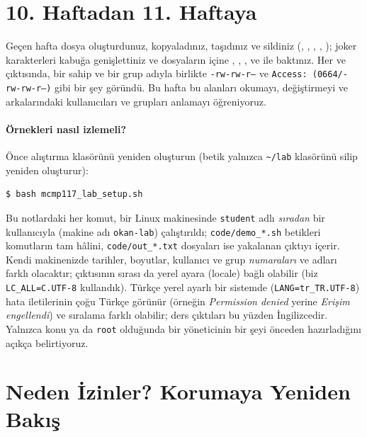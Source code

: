 \setcounter{tocdepth}{1}
\tableofcontents

\section{10. Haftadan 11. Haftaya}

Geçen hafta dosya oluşturdunuz, kopyaladınız, taşıdınız ve sildiniz (, , , , ); joker karakterleri kabuğa genişlettiniz ve dosyaların içine , , ,  ve  ile baktınız. Her  ve  çıktısında, bir sahip ve bir grup adıyla birlikte \texttt{-rw-rw-r--} ve \texttt{Access: (0664/-rw-rw-r--)} gibi bir şey göründü. Bu hafta bu alanları okumayı, değiştirmeyi ve arkalarındaki kullanıcıları ve grupları anlamayı öğreniyoruz.

\paragraph{Örnekleri nasıl izlemeli?} Önce alıştırma klasörünü yeniden oluşturun (betik yalnızca \texttt{\textasciitilde/lab} klasörünü silip yeniden oluşturur):
\begin{lstlisting}[style=term]
$ bash mcmp117_lab_setup.sh
\end{lstlisting}
Bu notlardaki her komut, bir Linux makinesinde \texttt{student} adlı \emph{sıradan} bir kullanıcıyla (makine adı \texttt{okan-lab}) çalıştırıldı; \texttt{code/demo\_*.sh} betikleri komutların tam hâlini, \texttt{code/out\_*.txt} dosyaları ise yakalanan çıktıyı içerir. Kendi makinenizde tarihler, boyutlar, kullanıcı ve grup \emph{numaraları} ve adları farklı olacaktır;  çıktısının sırası da yerel ayara (locale) bağlı olabilir (biz \texttt{LC\_ALL=C.UTF-8} kullandık). Türkçe yerel ayarlı bir sistemde (\texttt{LANG=tr\_TR.UTF-8}) hata iletilerinin çoğu Türkçe görünür (örneğin \emph{Permission denied} yerine \emph{Erişim engellendi}) ve sıralama farklı olabilir; ders çıktıları bu yüzden İngilizcedir. Yalnızca konu  ya da \texttt{root} olduğunda bir yöneticinin bir şeyi önceden hazırladığını açıkça belirtiyoruz.

\section{Neden İzinler? Korumaya Yeniden Bakış}

